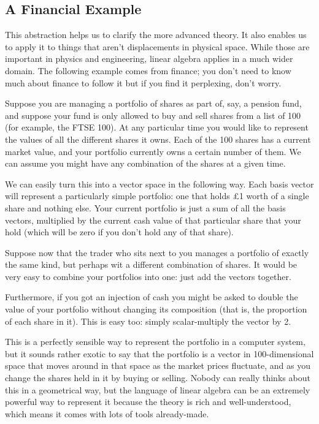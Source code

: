 \documentclass[oneside,english]{amsbook}
\numberwithin{section}{chapter}
\theoremstyle{plain}
\theoremstyle{definition}
\begin{document}
\subsection{A Financial Example}

This abstraction helps us to clarify the more advanced theory. It also
enables us to apply it to things that aren't displacements in physical
space. While those are important in physics and engineering, linear
algebra applies in a much wider domain. The following example comes from
finance; you don't need to know much about finance to follow it but if
you find it perplexing, don't worry.

Suppose you are managing a portfolio of shares as part of, say, a
pension fund, and suppose your fund is only allowed to buy and sell
shares from a list of 100 (for example, the FTSE 100). At any particular
time you would like to represent the values of all the different shares
it owns. Each of the 100 shares has a current market value, and your
portfolio currently owns a certain number of them. We can assume you
might have any combination of the shares at a given time.

We can easily turn this into a vector space in the following way. Each
basis vector will represent a particularly simple portfolio: one that
holds £1 worth of a single share and nothing else. Your current
portfolio is just a sum of all the basis vectors, multiplied by the
current cash value of that particular share that your hold (which will
be zero if you don't hold any of that share).

Suppose now that the trader who sits next to you manages a portfolio of
exactly the same kind, but perhaps wit a different combination of
shares. It would be very easy to combine your portfolios into one: just
add the vectors together.

Furthermore, if you got an injection of cash you might be asked to
double the value of your portfolio without changing its composition
(that is, the proportion of each share in it). This is easy too: simply
scalar-multiply the vector by 2.

This is a perfectly sensible way to represent the portfolio in a
computer system, but it sounds rather exotic to say that the portfolio
is a vector in 100-dimensional space that moves around in that space as
the market prices fluctuate, and as you change the shares held in it by
buying or selling. Nobody can really thinks about this in a geometrical
way, but the language of linear algebra can be an extremely powerful way
to represent it because the theory is rich and well-understood, which
means it comes with lots of tools already-made.
\end{document}
